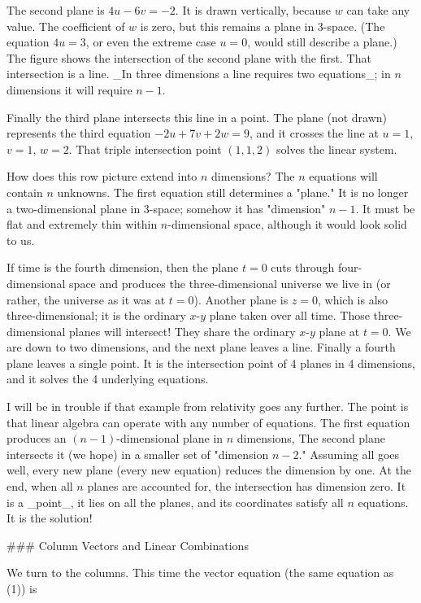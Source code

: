 The second plane is \(4u-6v=-2\). It is drawn vertically, because \(w\) can take any value. The coefficient of \(w\) is zero, but this remains a plane in 3-space. (The equation \(4u=3\), or even the extreme case \(u=0\), would still describe a plane.) The figure shows the intersection of the second plane with the first. That intersection is a line. _In three dimensions a line requires two equations_; in \(n\) dimensions it will require \(n-1\).

Finally the third plane intersects this line in a point. The plane (not drawn) represents the third equation \(-2u+7v+2w=9\), and it crosses the line at \(u=1\), \(v=1\), \(w=2\). That triple intersection point \((1,1,2)\) solves the linear system.

How does this row picture extend into \(n\) dimensions? The \(n\) equations will contain \(n\) unknowns. The first equation still determines a "plane." It is no longer a two-dimensional plane in 3-space; somehow it has "dimension" \(n-1\). It must be flat and extremely thin within \(n\)-dimensional space, although it would look solid to us.

If time is the fourth dimension, then the plane \(t=0\) cuts through four-dimensional space and produces the three-dimensional universe we live in (or rather, the universe as it was at \(t=0\)). Another plane is \(z=0\), which is also three-dimensional; it is the ordinary \(x\)-\(y\) plane taken over all time. Those three-dimensional planes will intersect! They share the ordinary \(x\)-\(y\) plane at \(t=0\). We are down to two dimensions, and the next plane leaves a line. Finally a fourth plane leaves a single point. It is the intersection point of 4 planes in 4 dimensions, and it solves the 4 underlying equations.

I will be in trouble if that example from relativity goes any further. The point is that linear algebra can operate with any number of equations. The first equation produces an \((n-1)\)-dimensional plane in \(n\) dimensions, The second plane intersects it (we hope) in a smaller set of "dimension \(n-2\)." Assuming all goes well, every new plane (every new equation) reduces the dimension by one. At the end, when all \(n\) planes are accounted for, the intersection has dimension zero. It is a _point_, it lies on all the planes, and its coordinates satisfy all \(n\) equations. It is the solution!

### Column Vectors and Linear Combinations

We turn to the columns. This time the vector equation (the same equation as (1)) is

